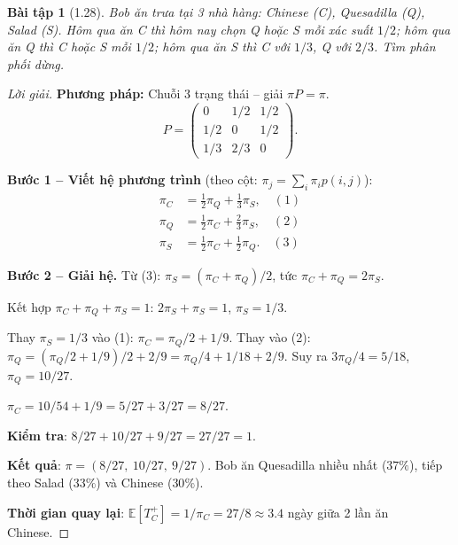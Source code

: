 \documentclass[8pt,a4paper]{article}
\newtheorem{exercise}{Bài tập}
\newenvironment{solution}{\begin{proof}[Lời giải]}{\end{proof}}
\newcommand{\E}{\mathbb{E}}
\begin{document}
\begin{exercise}[1.28]
Bob ăn trưa tại 3 nhà hàng: Chinese (C), Quesadilla (Q), Salad (S). Hôm qua ăn C thì hôm nay chọn Q hoặc S mỗi xác suất $1/2$; hôm qua ăn Q thì C hoặc S mỗi $1/2$; hôm qua ăn S thì C với $1/3$, Q với $2/3$. Tìm phân phối dừng.
\end{exercise}
\begin{solution}
\textbf{Phương pháp:} Chuỗi 3 trạng thái -- giải $\pi P = \pi$.
\[
  P = \begin{pmatrix} 0 & 1/2 & 1/2 \\ 1/2 & 0 & 1/2 \\ 1/3 & 2/3 & 0 \end{pmatrix}.
\]

\textbf{Bước 1 -- Viết hệ phương trình} (theo cột: $\pi_j = \sum_i \pi_i p(i,j)$):
\begin{align*}
  \pi_C &= \tfrac{1}{2}\pi_Q + \tfrac{1}{3}\pi_S, \quad (1)\\
  \pi_Q &= \tfrac{1}{2}\pi_C + \tfrac{2}{3}\pi_S, \quad (2)\\
  \pi_S &= \tfrac{1}{2}\pi_C + \tfrac{1}{2}\pi_Q. \quad (3)
\end{align*}

\textbf{Bước 2 -- Giải hệ.}
Từ (3): $\pi_S = (\pi_C + \pi_Q)/2$, tức $\pi_C + \pi_Q = 2\pi_S$.

Kết hợp $\pi_C + \pi_Q + \pi_S = 1$: $2\pi_S + \pi_S = 1$, $\pi_S = 1/3$.

Thay $\pi_S = 1/3$ vào (1): $\pi_C = \pi_Q/2 + 1/9$. Thay vào (2): $\pi_Q = (\pi_Q/2 + 1/9)/2 + 2/9 = \pi_Q/4 + 1/18 + 2/9$. Suy ra $3\pi_Q/4 = 5/18$, $\pi_Q = 10/27$.

$\pi_C = 10/54 + 1/9 = 5/27 + 3/27 = 8/27$.

\textbf{Kiểm tra}: $8/27 + 10/27 + 9/27 = 27/27 = 1$. \checkmark

\textbf{Kết quả}: $\pi = (8/27,\ 10/27,\ 9/27)$. Bob ăn Quesadilla nhiều nhất ($37\%$), tiếp theo Salad ($33\%$) và Chinese ($30\%$).

\textbf{Thời gian quay lại}: $\E[T_C^+] = 1/\pi_C = 27/8 \approx 3.4$ ngày giữa 2 lần ăn Chinese.
\end{solution}
\end{document}
